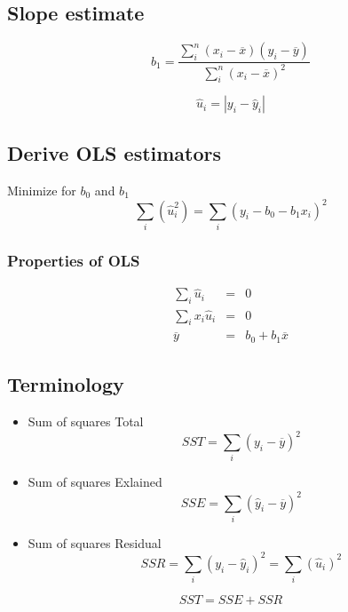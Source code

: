 \documentclass[a4paper,titlepage] {scrartcl}
\begin{document}
\subsection{Slope estimate}
\begin{equation}
	b_1=\frac{\sum_i^n(x_i-\overline x)(y_i-\overline y)}{\sum_i^n(x_i-\overline x)^2}
\end{equation}

\begin{equation}
	\hat u_i=|y_i-\hat y_i|
\end{equation}

\subsection{Derive OLS estimators}
Minimize for $b_0$ and $b_1$
\begin{equation}
	\sum_i(\hat u_i^2)=\sum_i(y_i-b_0-b_1x_i)^2
\end{equation}

\subsubsection{Properties of OLS}
\begin{eqnarray}
	\sum_i\hat u_i&=&0\\
	\sum_ix_i\hat u_i&=&0\\
	\overline y &=& b_0+b_1\overline x
\end{eqnarray}

\subsection{Terminology}
\begin{itemize}
	\item Sum of squares Total 
	\begin{equation}
		SST = \sum_i(y_i-\overline y)^2
	\end{equation}
	\item Sum of squares Exlained
	\begin{equation}
		SSE = \sum_i(\hat y_i-\overline y)^2
	\end{equation}
	\item Sum of squares Residual
	\begin{equation}
		SSR = \sum_i(y_i-\hat y_i)^2= \sum_i(\hat u_i)^2
	\end{equation}
\end{itemize}
\begin{equation}
	SST = SSE + SSR
\end{equation}
\end{document}
